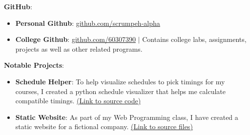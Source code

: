 \documentclass[letterpaper,11pt]{article}
\newcommand{\resumeItem}[1]{
  \item\small{
    {#1 \vspace{-2pt}}
  }
}
\newcommand{\resumeItemListStart}{\begin{itemize}}
\newcommand{\resumeItemListEnd}{\end{itemize}\vspace{-5pt}}
\begin{document}
 \begin{itemize}[leftmargin=0.15in, label={}]
    \small{\item{
    \vspace{1mm}
     \textbf{GitHub}{:} \\
    \resumeItemListStart
        \vspace{-2mm}
        \resumeItem{
        \textbf{Personal Github}: \href{https://www.github.com/scrumpeh-alpha/}{\underline{github.com/scrumpeh-alpha}}
        }
        \resumeItem{
        \textbf{College Github}: \href{https://www.github.com/60307390/}{\underline{github.com/60307390}} $|$ Contains college labs, assignments, projects as well as other related programs.
        }
    \resumeItemListEnd
    
     \vspace{1mm}
     
    \textbf{Notable Projects}{: } \\
    \resumeItemListStart
        \vspace{-2mm}
        \resumeItem{\textbf{Schedule Helper}: To help visualize schedules to pick timings for my courses, I created a python schedule visualizer that helps me calculate compatible timings. \href{https://github.com/60307390/scheduler-udst}{(\underline{Link to source code})}
        }
         \resumeItem{\textbf{Static Website}: As part of my Web Programming class, I have created a static website for a fictional company.
         \href{https://github.com/60307390/udst/tree/main/Year\%202/INFS\%202101/Project}{(\underline{Link to source files})}
         }
    \resumeItemListEnd
     \vspace{1mm}
    }}

 \end{itemize}

\end{document}
